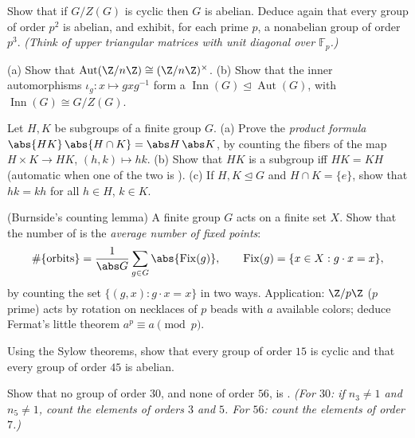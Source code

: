 \begin{exercise}[$\star$]\label{exo:b3:groups:2}
Show that if $G/Z(G)$ is cyclic then $G$ is abelian. Deduce again
that every group of order $p^2$ is abelian, and exhibit, for each
prime $p$, a nonabelian group of order $p^3$. \emph{(Think of
upper triangular matrices with unit diagonal over $\mathbb F_p$.)}
\end{exercise}

\begin{exercise}[$\star$]\label{exo:b3:groups:3}
(a) Show that $\operatorname{Aut}(\Z/n\Z) \cong (\Z/n\Z)^\times$.
(b) Show that the inner automorphisms $\iota_g \colon x \mapsto
gxg^{-1}$ form a  $\operatorname{Inn}(G)
\trianglelefteq \operatorname{Aut}(G)$, with
$\operatorname{Inn}(G) \cong G/Z(G)$.
\end{exercise}

\begin{exercise}[$\star\star$]\label{exo:b3:groups:4}
Let $H, K$ be subgroups of a finite group $G$.
(a) Prove the \emph{product formula} $\abs{HK}\,\abs{H\cap K} =
\abs H\, \abs K$, by counting the fibers of the map $H \times K
\to HK$, $(h,k) \mapsto hk$.
(b) Show that $HK$ is a subgroup iff $HK = KH$ (automatic when one
of the two is ).
(c) If $H, K \trianglelefteq G$ and $H \cap K = \{e\}$, show that
$hk = kh$ for all $h \in H$, $k \in K$.
\end{exercise}

\begin{exercise}[$\star\star$]\label{exo:b3:groups:5}
(Burnside's counting lemma) A finite group $G$ acts on a finite
set $X$. Show that the number of  is the \emph{average
number of fixed points}:
\[
\#\{\text{orbits}\} = \frac{1}{\abs G}\sum_{g \in G}
\abs{\operatorname{Fix}(g)},
\qquad \operatorname{Fix}(g) = \{x \in X : g \cdot x = x\},
\]
by counting the set $\{(g,x) : g\cdot x = x\}$ in two ways.
Application: $\Z/p\Z$ ($p$ prime) acts by rotation on necklaces of
$p$ beads with $a$ available colors; deduce Fermat's little
theorem $a^p \equiv a \pmod p$.
\end{exercise}

\begin{exercise}[$\star$]\label{exo:b3:groups:6}
Using the Sylow theorems, show that every group of order $15$ is
cyclic and that every group of order $45$ is abelian.
\end{exercise}

\begin{exercise}[$\star\star$]\label{exo:b3:groups:7}
Show that no group of order $30$, and none of order $56$, is
. \emph{(For $30$: if $n_3 \neq 1$ and $n_5 \neq 1$, count
the elements of orders $3$ and $5$. For $56$: count the elements
of order $7$.)}
\end{exercise}

